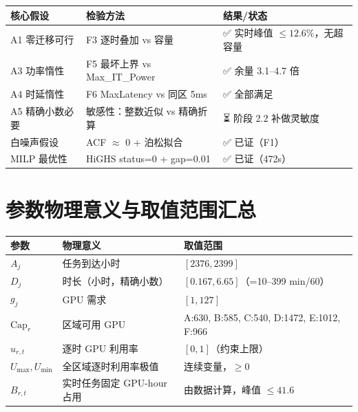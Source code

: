 \documentclass{internal-report}
\begin{document}
\begin{center}
\footnotesize
\begin{tabular}{p{3.6cm}p{4.6cm}p{5.4cm}}
\toprule
核心假设 & 检验方法 & 结果/状态 \\
\midrule
A1 零迁移可行 & F3 逐时叠加 vs 容量 & ✅ 实时峰值 $\le 12.6\%$，无超容量 \\
A3 功率惰性 & F5 最坏上界 vs Max\_IT\_Power & ✅ 余量 3.1--4.7 倍 \\
A4 时延惰性 & F6 MaxLatency vs 同区 5ms & ✅ 全部满足 \\
A5 精确小数必要 & 敏感性：整数近似 vs 精确折算 & ⏳ 阶段 2.2 补做灵敏度 \\
白噪声假设 & ACF $\approx$ 0 + 泊松拟合 & ✅ 已证（F1） \\
MILP 最优性 & HiGHS status=0 + gap=0.01 & ✅ 已证（472s） \\
\bottomrule
\end{tabular}
\end{center}

\section{参数物理意义与取值范围汇总}

\begin{center}
\footnotesize
\begin{tabular}{p{2.2cm}p{5.6cm}p{5.6cm}}
\toprule
参数 & 物理意义 & 取值范围 \\
\midrule
$A_j$ & 任务到达小时 & $[2376,2399]$ \\
$D_j$ & 时长（小时，精确小数） & $[0.167,6.65]$（=10--399 min/60） \\
$g_j$ & GPU 需求 & $[1,127]$ \\
$\text{Cap}_r$ & 区域可用 GPU & A:630, B:585, C:540, D:1472, E:1012, F:966 \\
$u_{r,t}$ & 逐时 GPU 利用率 & $[0,1]$（约束上限） \\
$U_{\max}, U_{\min}$ & 全区域逐时利用率极值 & 连续变量，$\ge 0$ \\
$B_{r,t}$ & 实时任务固定 GPU-hour 占用 & 由数据计算，峰值 $\le 41.6$ \\
\bottomrule
\end{tabular}
\end{center}
\end{document}
